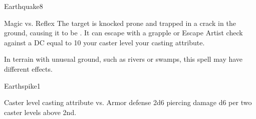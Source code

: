 \begin{spellsection}{Earthquake}{8}
\begin{spellheader}
\end{spellheader}
\begin{spellcontent}
    \begin{spelltargetinginfo}
    \end{spelltargetinginfo}
    \begin{spelleffects}
        \begin{spellattack}{Magic vs. Reflex}
            \spellsuccess The target is knocked prone and trapped in a crack in the ground, causing it to be \immobilized. It can escape with a grapple or Escape Artist check against a DC equal to 10 \add your caster level \add your casting attribute.
        \end{spellattack}
    \end{spelleffects}
\end{spellcontent}
\begin{spellfooter}
    \spellnotes In terrain with unusual ground, such as rivers or swamps, this spell may have different effects.

    \physicalspellnotes
\end{spellfooter}
\end{spellsection}

\begin{spellsection}{Earthspike}{1}
\begin{spellheader}
\end{spellheader}
\begin{spellcontent}
    \begin{spelltargetinginfo}
        \spellrng{\rngmed}
    \end{spelltargetinginfo}
    \begin{spelleffects}
        \begin{spellattack}{Caster level \add casting attribute vs. Armor defense}
            \spellsuccess 2d6 piercing damage \add d6 per two caster levels above 2nd.
        \end{spellattack}
    \end{spelleffects}
\end{spellcontent}
\begin{spellfooter}
\end{spellfooter}
\end{spellsection}

